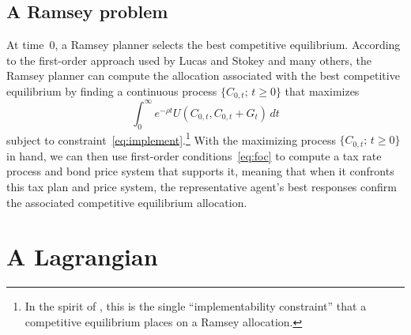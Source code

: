 \documentclass[12pt]{article}
\begin{document}
{\subsection{A Ramsey problem}\label{subsec:Ramsey_prob}

{At time~0, a Ramsey planner selects the best competitive equilibrium.} According to the first-order approach used by Lucas and Stokey and many others,
the Ramsey planner can compute the allocation associated with the best competitive equilibrium by %
%
finding  a continuous process $\{C_{0,t};\, t \ge 0\}$ that maximizes
\begin{equation}\label{eq:ramsey_obj}
\int_0^\infty e^{-\rho t} U(C_{0,t}, C_{0,t}+G_t)\, dt
\end{equation}
subject to  constraint~\eqref{eq:implement}.\footnote{In the spirit of \cite{LucasStokey1983}, this is the single ``implementability constraint'' that a competitive equilibrium places on a Ramsey allocation.} With the maximizing  process $\{C_{0,t};\, t \ge 0\}$ in hand, we can then use first-order conditions~\eqref{eq:foc} to  compute a tax rate process and bond price system that supports it, meaning that when it confronts this   tax plan and  price system, the representative agent's best responses confirm the associated competitive equilibrium allocation.


\section{A Lagrangian}\label{sec:Lagrange}

}
\end{document}
